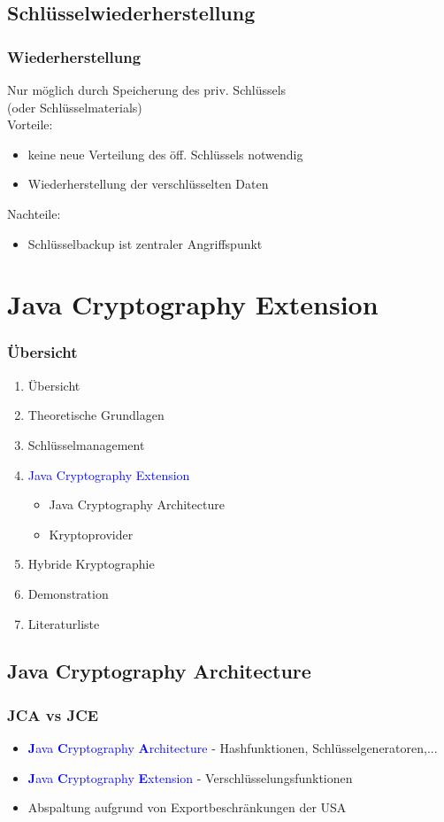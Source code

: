 \documentclass{beamer}
\begin{document}
\subsection*{Schlüsselwiederherstellung}
\begin{frame}
\frametitle{Wiederherstellung}
Nur möglich durch Speicherung des priv. Schlüssels \\(oder Schlüsselmaterials)\\
Vorteile:
\begin{itemize}
\item keine neue Verteilung des öff. Schlüssels notwendig
\item Wiederherstellung der verschlüsselten Daten
\end{itemize}
Nachteile:
\begin{itemize}
\item Schlüsselbackup ist zentraler Angriffspunkt 
\end{itemize}
\end{frame}

\section{Java Cryptography Extension}
\begin{frame}
\frametitle{Übersicht}
\begin{enumerate}
\item Übersicht
\item Theoretische Grundlagen
\item Schlüsselmanagement
\item \textcolor{blue}{Java Cryptography Extension}
\begin{itemize}
	\item Java Cryptography Architecture
	\item Kryptoprovider
\end{itemize}
\item Hybride Kryptographie
\item Demonstration
\item Literaturliste
\end{enumerate}
\end{frame}

\subsection*{Java Cryptography Architecture}
\begin{frame}
\frametitle{JCA vs JCE}
\begin{itemize}
\item \textcolor{blue}{\textbf{J}ava \textbf{C}ryptography \textbf{A}rchitecture} - Hashfunktionen, Schlüsselgeneratoren,...
\item \textcolor{blue}{\textbf{J}ava \textbf{C}ryptography \textbf{E}xtension} - Verschlüsselungsfunktionen
\item Abspaltung aufgrund von Exportbeschränkungen der USA
\end{itemize}
\end{frame}
\end{document}
